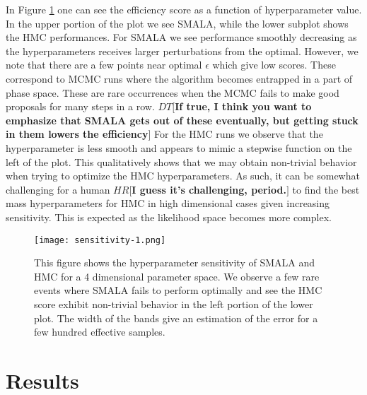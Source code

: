 \documentclass{aa}
\def\memohr#1{\color{blue}$HR[${\bf #1}$]$ \color{black}}
\def\memodt#1{\color{green}$DT[${\bf #1}$]$ \color{black}}
\begin{document}
In Figure \ref{sensfig} one can see the efficiency score as a function of hyperparameter value. 
In the upper portion of the plot we see SMALA, while the lower subplot shows the HMC performances. For SMALA we see performance smoothly decreasing as the hyperparameters receives larger perturbations from the optimal. 
However, we note that there are a few points near optimal $\epsilon$ which give low scores. 
These correspond to MCMC runs where the algorithm becomes entrapped in a part of phase space. 
These are rare occurrences when the MCMC fails to make good proposals for many steps in a row. \memodt{If true, I think you want to emphasize that SMALA gets out of these eventually, but getting stuck in them lowers the efficiency}
For the HMC runs we observe that the hyperparameter is less smooth and appears to mimic a stepwise function on the left of the plot. 
This qualitatively shows that we may obtain non-trivial behavior when trying to optimize the HMC hyperparameters. 
As such, it can be somewhat challenging for a human \memohr{I guess it's challenging, period.} to find the best mass hyperparameters for HMC in high dimensional cases given increasing sensitivity. 
This is expected as the likelihood space becomes more complex.

\begin{figure}
\centering
\texttt{[image: sensitivity-1.png]}
   \caption{This figure shows the hyperparameter sensitivity of SMALA and HMC for a 4 dimensional parameter space. 
We observe a few rare events where SMALA fails to perform optimally and see the HMC score exhibit non-trivial behavior in the left portion of the lower plot. 
The width of the bands give an estimation of the error for a few hundred effective samples.}
      \label{sensfig}
\end{figure}

\section{Results}\label{results}
\end{document}
